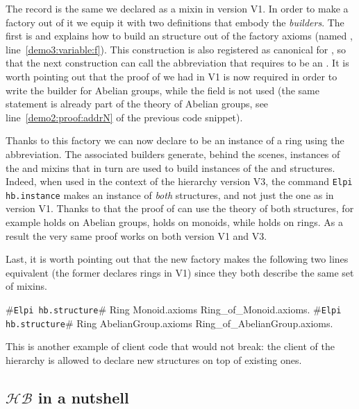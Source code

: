 \documentclass[a4paper,UKenglish,cleveref, autoref]{lipics-v2019}
\newcommand{\HB}{\ensuremath{\mathcal{HB}}}
\newcommand{\mixin}{mixin}
\newcommand{\mixins}{mixins}
\newcommand{\factory}{factory}
\newcommand{\phantterm}{abbreviation}
\newcommand{\builder}{builder}
\newcommand{\hbinstance}{{\tt\color{dkgreen}Elpi hb.instance}}
\newcommand{\hbstructure}{{\tt\color{dkgreen}Elpi hb.structure}}
\theoremstyle{implem}
\theoremstyle{implem}
\theoremstyle{command}
\begin{document}
The record  is the same we declared as a \mixin{}
in version V1. In order to make a \factory{} out of it we equip it with
two definitions that embody the \emph{\builder{}s}.
The first is  and
explains how to build an  structure out of the \factory{}
axioms (named , line~\ref{demo3:variable:f}).
This construction is also registered as canonical for ,
so that the next construction  can call
the  \phantterm{} that requires  to be
an .
It is worth pointing out that the proof of  we had in V1 is now
required in order to write the \builder{} for Abelian groups, while
the  field is not used (the same statement is already part of
the theory of Abelian groups, see line~\ref{demo2:proof:addrN} of the previous
code snippet).

Thanks to this \factory{} we can now declare  to be an instance
of a ring using the  \phantterm{}.
The associated \builder{}s generate, behind the scenes, instances of the
 and  \mixins{}
that in turn are used to build instances of the  and 
structures. Indeed, when used in the context of the hierarchy version V3,
the command \hbinstance{} 
makes  an instance of \emph{both} structures, and not just the 
one as in version V1.
Thanks to that the proof of  can use the theory of
both structures, for example  holds on Abelian groups,
 holds on monoids, while  holds on rings.
As a result the very same proof works on both
version V1 and V3.

Last, it is worth pointing out that the new \factory{} makes the following
two lines equivalent (the former declares
rings in V1) since they both describe the same set of \mixins{}.

\begin{coqcode}
#\hbstructure{}# Ring Monoid.axioms Ring_of_Monoid.axioms.
#\hbstructure{}# Ring AbelianGroup.axioms Ring_of_AbelianGroup.axioms.
\end{coqcode}

This is another example of client code that would not break: the client of the hierarchy is allowed to declare new
structures on top of existing ones.

\subsection{\HB{} in a nutshell}
\end{document}
